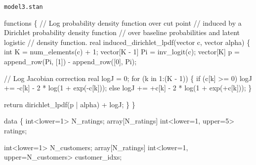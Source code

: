 \documentclass[
  letterpaper,
  DIV=11,
  numbers=noendperiod]{scrartcl}
\newenvironment{Shaded}{\begin{snugshade}}{\end{snugshade}}
\newcommand{\CommentTok}[1]{\textcolor[rgb]{0.37,0.37,0.37}{#1}}
\newcommand{\ControlFlowTok}[1]{\textcolor[rgb]{0.00,0.23,0.31}{#1}}
\newcommand{\DataTypeTok}[1]{\textcolor[rgb]{0.68,0.00,0.00}{#1}}
\newcommand{\DecValTok}[1]{\textcolor[rgb]{0.68,0.00,0.00}{#1}}
\newcommand{\KeywordTok}[1]{\textcolor[rgb]{0.00,0.23,0.31}{#1}}
\newcommand{\NormalTok}[1]{\textcolor[rgb]{0.00,0.23,0.31}{#1}}
\begin{document}
\begin{codelisting}

\caption{\texttt{model3.stan}}

\begin{Shaded}
\begin{Highlighting}[]
\KeywordTok{functions}\NormalTok{ \{}
  \CommentTok{// Log probability density function over cut point}
  \CommentTok{// induced by a Dirichlet probability density function}
  \CommentTok{// over baseline probabilities and latent logistic}
  \CommentTok{// density function.}
  \DataTypeTok{real}\NormalTok{ induced\_dirichlet\_lpdf(}\DataTypeTok{vector}\NormalTok{ c, }\DataTypeTok{vector}\NormalTok{ alpha) \{}
    \DataTypeTok{int}\NormalTok{ K = num\_elements(c) + }\DecValTok{1}\NormalTok{;}
    \DataTypeTok{vector}\NormalTok{[K {-} }\DecValTok{1}\NormalTok{] Pi = inv\_logit(c);}
    \DataTypeTok{vector}\NormalTok{[K] p = append\_row(Pi, [}\DecValTok{1}\NormalTok{]\textquotesingle{}) {-} append\_row([}\DecValTok{0}\NormalTok{]\textquotesingle{}, Pi);}

    \CommentTok{// Log Jacobian correction}
    \DataTypeTok{real}\NormalTok{ logJ = }\DecValTok{0}\NormalTok{;}
    \ControlFlowTok{for}\NormalTok{ (k }\ControlFlowTok{in} \DecValTok{1}\NormalTok{:(K {-} }\DecValTok{1}\NormalTok{)) \{}
      \ControlFlowTok{if}\NormalTok{ (c[k] \textgreater{}= }\DecValTok{0}\NormalTok{)}
\NormalTok{        logJ += {-}c[k] {-} }\DecValTok{2}\NormalTok{ * log(}\DecValTok{1}\NormalTok{ + exp({-}c[k]));}
      \ControlFlowTok{else}
\NormalTok{        logJ += +c[k] {-} }\DecValTok{2}\NormalTok{ * log(}\DecValTok{1}\NormalTok{ + exp(+c[k]));}
\NormalTok{    \}}

    \ControlFlowTok{return}\NormalTok{ dirichlet\_lpdf(p | alpha) + logJ;}
\NormalTok{  \}}
\NormalTok{\}}

\KeywordTok{data}\NormalTok{ \{}
  \DataTypeTok{int}\NormalTok{\textless{}}\KeywordTok{lower}\NormalTok{=}\DecValTok{1}\NormalTok{\textgreater{} N\_ratings;}
  \DataTypeTok{array}\NormalTok{[N\_ratings] }\DataTypeTok{int}\NormalTok{\textless{}}\KeywordTok{lower}\NormalTok{=}\DecValTok{1}\NormalTok{, }\KeywordTok{upper}\NormalTok{=}\DecValTok{5}\NormalTok{\textgreater{} ratings;}

  \DataTypeTok{int}\NormalTok{\textless{}}\KeywordTok{lower}\NormalTok{=}\DecValTok{1}\NormalTok{\textgreater{} N\_customers;}
  \DataTypeTok{array}\NormalTok{[N\_ratings] }\DataTypeTok{int}\NormalTok{\textless{}}\KeywordTok{lower}\NormalTok{=}\DecValTok{1}\NormalTok{, }\KeywordTok{upper}\NormalTok{=N\_customers\textgreater{} customer\_idxs;}


\end{Highlighting}
\end{Shaded}
\end{codelisting}
\end{document}
